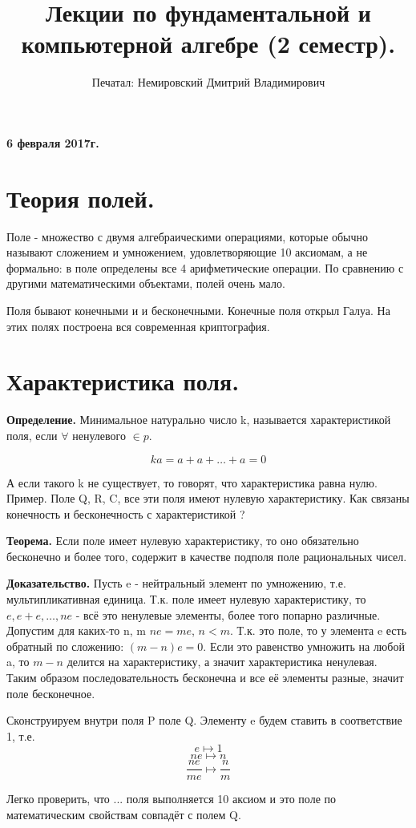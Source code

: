 \documentclass{article}
\title{Лекции по фундаментальной и компьютерной алгебре (2 семестр).}
\author{Печатал: Немировский Дмитрий Владимирович}
\begin{document}
\maketitle
\textbf {6 февраля 2017г.}
\section*{Теория полей.}
Поле - множество с двумя алгебраическими операциями, которые обычно называют сложением и умножением, удовлетворяющие 10 аксиомам, а не формально: в поле определены все 4 арифметические операции. По сравнению с другими математическими объектами, полей очень мало.

Поля бывают конечными и и бесконечными. Конечные поля открыл Галуа. На этих полях построена вся современная криптография.

\section*{Характеристика поля.}
{\bf Определение.} Минимальное натурально число k, называется характеристикой поля, если $\forall$ ненулевого $\in p$. 

$$ka=a+a+\ldots+a=0$$

А если такого k не существует, то говорят, что характеристика равна нулю. Пример. Поле Q, R, C, все эти поля имеют нулевую характеристику.
Как связаны конечность и бесконечность с характеристикой ?

{\bf Теорема.} Если поле имеет нулевую характеристику, то оно обязательно бесконечно и более того, содержит в качестве подполя поле рациональных чисел.

{\bf Доказательство.} Пусть e - нейтральный элемент по умножению, т.е. мультипликативная единица. Т.к. поле имеет нулевую характеристику, то $e,e+e,\ldots,ne$ - всё это ненулевые элементы, более того попарно различные. Допустим для каких-то n, m $ne=me$, $n<m$. Т.к. это поле, то у элемента e есть обратный по сложению: $(m-n)e=0$. Если это равенство умножить на любой a, то $m-n$ делится на характеристику, а значит характеристика ненулевая. Таким образом последовательность бесконечна и  все её элементы разные, значит поле бесконечное.

Сконструируем внутри поля P поле Q. Элементу e будем ставить в соответствие 1, т.е. $$e\mapsto1$$ $$ne\mapsto n$$ $$\frac{ne}{me}\mapsto\frac{n}{m}$$

Легко проверить, что ... поля выполняется 10 аксиом и это поле по математическим свойствам совпадёт с полем Q.
\end{document}
